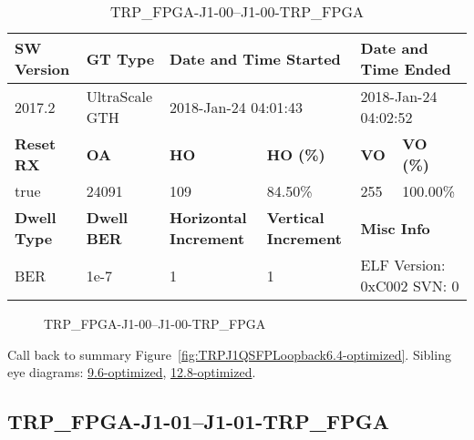 \begin{table}[h]
\centering
\caption{TRP\_FPGA-J1-00--J1-00-TRP\_FPGA}
\label{tab:TRPFPGAJ100J100TRPFPGA6.4-optimized}
\begin{tabular}{@{}|l|l|l|l|l|l|@{}}
\toprule
\textbf{SW Version}                & \textbf{GT Type}   & \multicolumn{2}{l|}{\textbf{Date and Time Started}}            & \multicolumn{2}{l|}{\textbf{Date and Time Ended}}        \\ \midrule
2017.2                       & UltraScale GTH          & \multicolumn{2}{l|}{2018-Jan-24 04:01:43}                   & \multicolumn{2}{l|}{2018-Jan-24 04:02:52}               \\ \midrule
\textbf{Reset RX}                  & \textbf{OA} & \textbf{HO}   & \textbf{HO (\%)} & \textbf{VO} & \textbf{VO (\%)} \\ \midrule
true & 24091        & 109          & 84.50\%        & 255        & 100.00\%       \\ \midrule
\textbf{Dwell Type}                & \textbf{Dwell BER} & \textbf{Horizontal Increment} & \textbf{Vertical Increment}    & \multicolumn{2}{l|}{\textbf{Misc Info}}                  \\ \midrule
BER                            & 1e-7        & 1        & 1           & \multicolumn{2}{l|}{ELF Version: 0xC002 SVN: 0}                         \\ \bottomrule
\end{tabular}
\end{table}

\begin{figure}[h]
\caption{TRP\_FPGA-J1-00--J1-00-TRP\_FPGA} \label{fig:TRPFPGAJ100J100TRPFPGA6.4-optimized}
\end{figure}

Call back to summary Figure~\ref{fig:TRPJ1QSFPLoopback6.4-optimized}.
Sibling eye diagrams: \hyperref[sec:TRPFPGAJ100J100TRPFPGA9.6-optimized]{9.6-optimized}, \hyperref[sec:TRPFPGAJ100J100TRPFPGA12.8-optimized]{12.8-optimized}.

\clearpage
\newpage


\subsection{TRP\_FPGA-J1-01--J1-01-TRP\_FPGA}\label{sec:TRPFPGAJ101J101TRPFPGA6.4-optimized}

